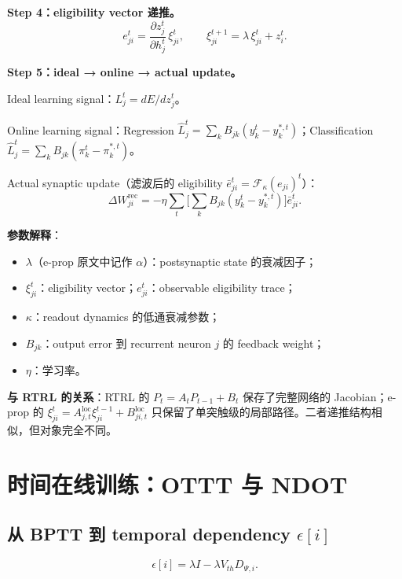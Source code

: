 \documentclass[journal,12pt,onecolumn]{IEEEtran}
\begin{document}
\textbf{Step 4：eligibility vector 递推。}
\begin{equation}
e_{ji}^t=\frac{\partial z_j^t}{\partial h_j^t}\,\xi_{ji}^t,
\qquad
\xi_{ji}^{t+1}=\lambda\,\xi_{ji}^t+z_i^t.
\end{equation}

\textbf{Step 5：ideal → online → actual update。}

Ideal learning signal：$L_j^t=dE/dz_j^t$。

Online learning signal：Regression $\widehat L_j^t=\sum_k B_{jk}(y_k^t-y_k^{*,t})$；Classification $\widehat L_j^t=\sum_k B_{jk}(\pi_k^t-\pi_k^{*,t})$。

Actual synaptic update（滤波后的 eligibility $\bar e_{ji}^t=\mathcal F_\kappa(e_{ji})^t$）：
\begin{equation}
\Delta W_{ji}^{\mathrm{rec}}
=
-\eta\sum_t\Big[\sum_k B_{jk}(y_k^t-y_k^{*,t})\Big]\bar e_{ji}^t.
\end{equation}

\textbf{参数解释}：
\begin{itemize}[leftmargin=1.5em,itemsep=0pt]
\item $\lambda$（e-prop 原文中记作 $\alpha$）：postsynaptic state 的衰减因子；
\item $\xi_{ji}^t$：eligibility vector；$e_{ji}^t$：observable eligibility trace；
\item $\kappa$：readout dynamics 的低通衰减参数；
\item $B_{jk}$：output error 到 recurrent neuron $j$ 的 feedback weight；
\item $\eta$：学习率。
\end{itemize}

\textbf{与 RTRL 的关系}：RTRL 的 $P_t=A_tP_{t-1}+B_t$ 保存了完整网络的 Jacobian；e-prop 的 $\xi_{ji}^t=A_{j,t}^{\mathrm{loc}}\xi_{ji}^{t-1}+B_{ji,t}^{\mathrm{loc}}$ 只保留了单突触级的局部路径。二者递推结构相似，但对象完全不同。

\section{时间在线训练：OTTT 与 NDOT}

\subsection{从 BPTT 到 temporal dependency $\epsilon[i]$}

\begin{equation}
\epsilon[i]
=
\lambda I-\lambda V_{th}D_{\Psi,i}.
\end{equation}
\end{document}
